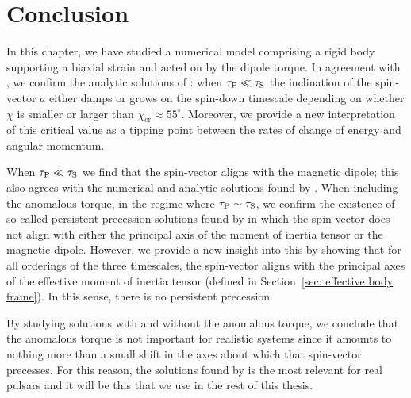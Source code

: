 \documentclass[../full_thesis/full_thesis.tex]{subfiles}
\begin{document}
\section{Conclusion}
\label{sec: conclusion rotating frame}

In this chapter, we have studied a numerical model comprising a rigid body
supporting a biaxial strain and acted on by the \citet{Deutsch1955} dipole
torque. In agreement with \citet{Melatos2000}, we confirm the analytic
solutions of \citet{Goldreich1970}: when $\tau_{\mathrm{P}} \ll \tau_{\mathrm{S}}$ the inclination of
the spin-vector $a$ either damps or grows on the spin-down timescale depending
on whether $\chi$ is smaller or larger than $\chi_\textrm{cr}\approx
55^{\circ}$. Moreover, we provide a new interpretation of this critical value
as a tipping point between the rates of change of energy and angular momentum.

When $\tau_{\mathrm{P}} \ll \tau_{\mathrm{S}}$ we find that the spin-vector aligns with the magnetic
dipole; this also agrees with the numerical and analytic solutions found by
\citet{Melatos2000}. When including the anomalous torque, in the regime where
$\tau_{\mathrm{P}} \sim \tau_{\mathrm{S}}$, we confirm the existence of so-called persistent precession
solutions found by \citet{Melatos2000} in which the spin-vector does not align
with either the principal axis of the moment of inertia tensor or the magnetic
dipole.  However, we provide a new insight into this by showing that for all
orderings of the three timescales, the spin-vector aligns with the principal
axes of the effective moment of inertia tensor (defined in Section~\ref{sec:
effective body frame}). In this sense, there is no persistent precession.

By studying solutions with and without the anomalous torque, we conclude that
the anomalous torque is not important for realistic systems since it amounts to
nothing more than a small shift in the axes about which that spin-vector
precesses. For this reason, the solutions found by \citet{Goldreich1970} is the
most relevant for real pulsars and it will be this that we use in the rest of
this thesis.


\end{document}
